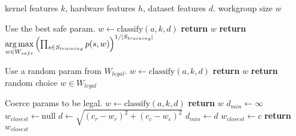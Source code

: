 \begin{algorithmic}[1]
\Require kernel features $k$, hardware features $h$, dataset features
$d$.
\Ensure workgroup size $w$

\Comment Use the best safe param.
\State $w \leftarrow \text{classify}(a, k, d)$
    \State \textbf{return} $w$
\Else
  \State \textbf{return} $\underset{w \in W_{safe}}{\operatorname*{arg\,max}}
\left(
  \prod_{s \in S_{training}} p(s, w)
\right)^{1/|S_{training}|}$
\EndIf
\EndProcedure
\item[]

\Comment Use a random param from $W_{legal}$.
\State $w \leftarrow \text{classify}(a, k, d)$
    \State \textbf{return} $w$
\Else
  \State \textbf{return} random choice $w \in W_{legal}$
\EndIf
\EndProcedure
\item[]

\Comment Coerce params to be legal.
\State $w \leftarrow \text{classify}(a, k, d)$
    \State \textbf{return} $w$
\Else
  \State $d_{min} \leftarrow \infty$
  \State $w_{closest} \leftarrow \text{null}$
    \State $d \leftarrow \sqrt{\left(c_r - w_r\right)^2 + \left(c_c - w_c\right)^2}$
      \State $d_{min} \leftarrow d$
      \State $w_{closest} \leftarrow c$
    \EndIf
  \EndFor
  \State \textbf{return} $w_{closest}$
\EndIf
\EndProcedure
\end{algorithmic}
